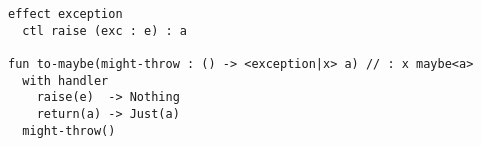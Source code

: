 \begin{algorithm}

\begin{verbatim}
effect exception
  ctl raise (exc : e) : a

fun to-maybe(might-throw : () -> <exception|x> a) // : x maybe<a>
  with handler
    raise(e)  -> Nothing
    return(a) -> Just(a)
  might-throw()
\end{verbatim}

\caption{Exception effect and handler in Koka. %
\label{alg-eff:koka-exc}}
\end{algorithm}